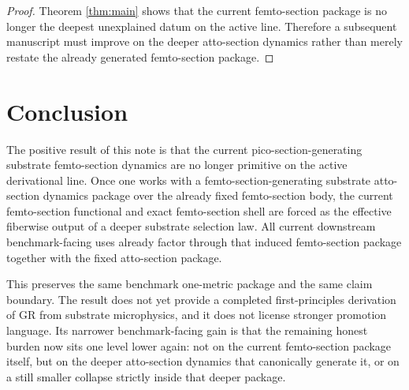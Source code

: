 \documentclass[11pt]{article}
\begin{document}
\begin{proof}
Theorem \ref{thm:main} shows that the current femto-section package is no longer the deepest unexplained datum on the active line. Therefore a subsequent manuscript must improve on the deeper atto-section dynamics rather than merely restate the already generated femto-section package.
\end{proof}

\section{Conclusion}

The positive result of this note is that the current pico-section-generating substrate femto-section dynamics are no longer primitive on the active derivational line. Once one works with a femto-section-generating substrate atto-section dynamics package over the already fixed femto-section body, the current femto-section functional and exact femto-section shell are forced as the effective fiberwise output of a deeper substrate selection law. All current downstream benchmark-facing uses already factor through that induced femto-section package together with the fixed atto-section package.

This preserves the same benchmark one-metric package and the same claim boundary. The result does not yet provide a completed first-principles derivation of GR from substrate microphysics, and it does not license stronger promotion language. Its narrower benchmark-facing gain is that the remaining honest burden now sits one level lower again: not on the current femto-section package itself, but on the deeper atto-section dynamics that canonically generate it, or on a still smaller collapse strictly inside that deeper package.
\end{document}
